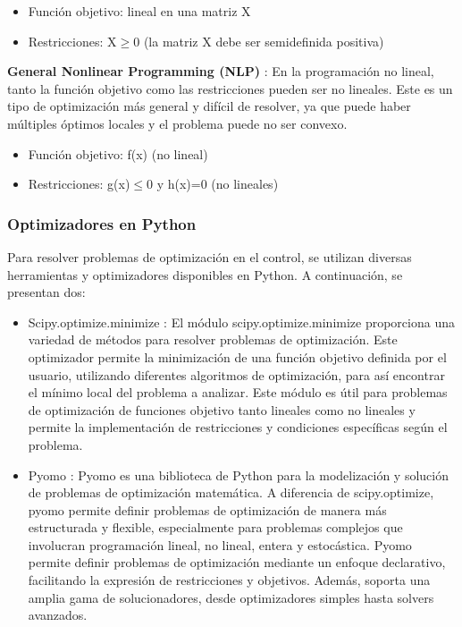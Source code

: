 \begin{itemize}
	\item Función objetivo: lineal en una matriz X
	\item Restricciones: X$\geq$0 (la matriz X debe ser semidefinida positiva)
\end{itemize}

\textbf{General Nonlinear Programming (NLP)
}: En la programación no lineal, tanto la función objetivo como las restricciones pueden ser no lineales. Este es un tipo de optimización más general y difícil de resolver, ya que puede haber múltiples óptimos locales y el problema puede no ser convexo.

\begin{itemize}
	\item Función objetivo: f(x) (no lineal)
	\item Restricciones: g(x)$\leq$0 y 	h(x)=0 (no lineales)
\end{itemize}

\subsubsection{Optimizadores en Python}

Para resolver problemas de optimización en el control, se utilizan diversas herramientas y optimizadores disponibles en Python. A continuación, se presentan dos:

\begin{itemize}
	\item Scipy.optimize.minimize \cite{ref31}: El módulo scipy.optimize.minimize proporciona una variedad de métodos para resolver problemas de optimización. Este optimizador permite la minimización de una función objetivo definida por el usuario, utilizando diferentes algoritmos de optimización, para así encontrar el mínimo local del problema a analizar. Este módulo es útil para problemas de optimización de funciones objetivo tanto lineales como no lineales y permite la implementación de restricciones y condiciones específicas según el problema.
	
	\item Pyomo \cite{ref32,ref33}: Pyomo es una biblioteca de Python para la modelización y solución de problemas de optimización matemática. A diferencia de scipy.optimize, pyomo permite definir problemas de optimización de manera más estructurada y flexible, especialmente para problemas complejos que involucran programación lineal, no lineal, entera y estocástica. Pyomo permite definir problemas de optimización mediante un enfoque declarativo, facilitando la expresión de restricciones y objetivos. Además, soporta una amplia gama de solucionadores, desde optimizadores simples hasta solvers avanzados.
	
	
\end{itemize}

